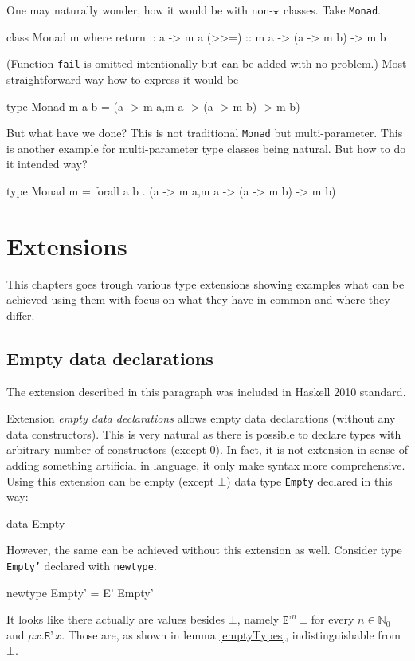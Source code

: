 \documentclass[11pt,oneside,draft]{fithesis2}
\begin{document}
One may naturally wonder, how it would be with non-\(\star\) classes.
Take \texttt{Monad}.
\begin{code}
class Monad m where
	return :: a -> m a
	(>>=) :: m a -> (a -> m b) -> m b
\end{code}
(Function \texttt{fail} is omitted intentionally but can be added with
no problem.)
Most straightforward way how to express it would be
\begin{code}
type Monad m a b = (a -> m a,m a -> (a -> m b) -> m b)
\end{code}
But what have we done? This is not traditional \texttt{Monad} but
multi-parameter. This is another example for multi-parameter type classes
being natural. But how to do it intended way?
\begin{code}
type Monad m = forall a b . (a -> m a,m a -> (a -> m b) -> m b)
\end{code}


\chapter{Extensions}

This chapters goes trough various type extensions showing examples
what can be achieved using them with focus on what they have in common
and where they differ.

\section{Empty data declarations}

The extension described in this paragraph was included in Haskell 2010 standard.

Extension \emph{empty data declarations} allows empty data declarations
(without any data constructors). This is very natural as there is possible
to declare types with arbitrary number of constructors (except 0). In
fact, it is not extension in sense of adding something artificial in
language, it only make syntax more comprehensive. Using this extension can
be empty (except \(\bot\)) data type \texttt{Empty} declared in this way:
\begin{code}
data Empty
\end{code}
However, the same can be achieved without this extension as well. Consider type \texttt{Empty'}
declared with \texttt{newtype}.
\begin{code}
newtype Empty' = E' Empty'
\end{code}
It looks like there actually are values besides \(\bot\), namely \(\texttt{E'}^n \, \bot\)
for every \(n \in \mathbb{N}_0\) and \(\mu x . \texttt{E'} \, x\).
Those are, as shown in lemma \ref{emptyTypes}, indistinguishable from \(\bot\).
\end{document}
